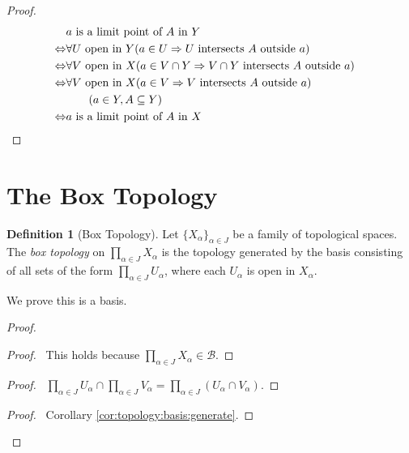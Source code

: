 \documentclass{report}
\let\qed\relax
\theoremstyle{definition}
\newtheorem{df}[lm]{Definition}
\begin{document}
  \begin{proof}
    \pf
    \begin{align*}
      & a \text{ is a limit point of } A \text{ in } Y \\
      \Leftrightarrow & \forall U \text{ open in } Y( a \in U \Rightarrow U
      \text{ intersects } A \text{ outside } a) \\
      \Leftrightarrow & \forall V \text{ open in } X( a \in V \cap Y
      \Rightarrow
      V \cap Y \text{ intersects } A \text{ outside } a) \\
      \Leftrightarrow & \forall V \text{ open in } X( a \in V \Rightarrow V
      \text{ intersects } A \text{ outside } a) \\
      & \qquad (a \in Y, A \subseteq Y) \\
      \Leftrightarrow & a \text{ is a limit point of } A \text{ in } X & \qed
    \end{align*}
  \end{proof}

  \section{The Box Topology}

  \begin{df}[Box Topology]
    Let $\{ X_\alpha \}_{\alpha \in J}$ be a family of topological spaces. The
    \emph{box topology} on $\prod_{\alpha \in J} X_\alpha$ is the topology
    generated by the basis consisting of all sets of the form $\prod_{\alpha
      \in J} U_\alpha$, where each $U_\alpha$ is open in $X_\alpha$.

    We prove this is a basis.
  \end{df}

  \begin{proof}
    \pf
    \begin{proof}
      \pf\ This holds because $\prod_{\alpha \in J} X_\alpha \in \mathcal{B}$.
    \end{proof}
    \begin{proof}
      \pf\ $\prod_{\alpha \in J} U_\alpha \cap \prod_{\alpha \in J} V_\alpha =
      \prod_{\alpha \in J} (U_\alpha \cap V_\alpha)$.
    \end{proof}
    \qedstep
    \begin{proof}
      \pf\ Corollary \ref{cor:topology:basis:generate}.
    \end{proof}
  \end{proof}
\end{document}
